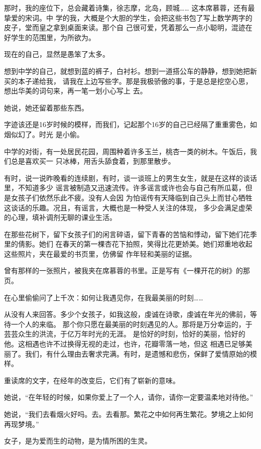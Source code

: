 		那时，我的座位下，总会藏着诗集，徐志摩，北岛，顾城…… 这本席慕蓉，还有最挚爱的宋词。中
	学的我，大概是个大胆的学生，会把这些书包了写上数学两字的皮子，堂而皇之拿到桌面来读。那个自
	己很可爱，凭着那么一点小聪明，混迹在好学生的范围里，为所欲为。

		现在的自己，显然是愚笨了太多。

		想到中学的自己，就想到蓝的裤子，白衬衫。想到一道搭公车的静静，想到她把新买的本子递给我，
	请我在上边写些字。那是我极骄傲的事，于是总是挖空心思，想出华美的词句来，再一笔一划小心写上
	去。

		她说，她还留着那些东西。

		字迹该还是16岁时候的模样，而我们，记起那个16岁的自己已经隔了重重雾色，如烟似幻了。时光
	是小偷。


		中学的对街，有一处居民花园，周围种着许多玉兰，桃杏一类的树木。午饭后，我们总是喜欢买一
	只冰棒，用舌头舔食着，到那里散步。

		有时，说一说昨晚看的连续剧，有时，谈一谈班上的男生女生，就是在这样的谈话里，不知道多少
	谣言被制造又迅速流传。许多谣言或许也会与自己有所瓜葛，但是女孩子们依然乐此不疲。没有人会因
	为怕谣传有天降临到自己头上而甘心牺牲这谈话的乐趣。况且，有谣言，大概也是一种受人关注的体现，
	多少会满足虚荣的心理，填补调剂无聊的课业生活。


		在那些花树下，留下女孩子们的闲言碎语，留下青春的苦恼和悸动，留下她们花季里的倩影。她们
	在春天的第一棵杏花下拍照，笑得比花更娇美。她们郑重地收起这些照片，夹在最爱的书页里，仿佛留
	作年轻和美丽的证据。

		曾有那样的一张照片，被我夹在席慕蓉的书里。正是写有《一棵开花的树》的那页。


		在心里偷偷问了上千次：如何让我遇见你，在我最美丽的时刻……

		从没有人来回答。多少个女孩子，如我这般，虔诚在诗歌，虔诚在年光的佛前，等待一个人的来临。
	那个你只愿在最美丽的时刻遇见的人。那将是万分幸运的，于芸芸众生的洪流，于亿万年时光的无涯。
	是恰好的时刻，恰好的美丽，恰好的他。这相遇也许不过换得无视的走过，也许，花瓣零落一地，但这
	相遇已足够美丽了。我们，有什么理由去奢求完满。有时，是遗憾和悲伤，保鲜了爱情原始的模样。


		重读席的文字，在经年的改变后，它们有了崭新的意味。

		她说，“在年轻的时候，如果你爱上了一个人，请你，请你一定要温柔地对待他。”

		她说，“我们去看烟火好吗。去。去看那。繁花之中如何再生繁花。梦境之上如何再现梦境。”

		女子，是为爱而生的动物，是为情所困的生灵。

